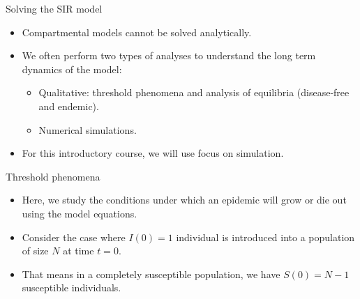 \documentclass[
  ignorenonframetext,
]{beamer}
\providecommand{\tightlist}{%
  \setlength{\itemsep}{0pt}\setlength{\parskip}{0pt}}\usepackage{longtable,booktabs,array}
\begin{document}
\begin{frame}
\begin{block}{Solving the SIR model}
\label{solving-the-sir-model}
\begin{itemize}
\item
  Compartmental models cannot be solved analytically.
\item
  We often perform two types of analyses to understand the {long term
  dynamics} of the model:

  \begin{itemize}
  \tightlist
  \item
    Qualitative: threshold phenomena and analysis of equilibria
    (disease-free and endemic).\\
  \item
    Numerical simulations.
  \end{itemize}
\end{itemize}

\begin{tcolorbox}[enhanced jigsaw, toprule=.15mm, opacityback=0, bottomtitle=1mm, opacitybacktitle=0.6, colframe=quarto-callout-note-color-frame, titlerule=0mm, breakable, colback=white, title=\textcolor{quarto-callout-note-color}{\faInfo}\hspace{0.5em}{Note}, left=2mm, colbacktitle=quarto-callout-note-color!10!white, arc=.35mm, coltitle=black, bottomrule=.15mm, rightrule=.15mm, leftrule=.75mm, toptitle=1mm]

\begin{itemize}
\tightlist
\item
  For this introductory course, we will use focus on simulation.
\end{itemize}

\end{tcolorbox}
\end{block}
\end{frame}

\begin{frame}
\begin{block}{Threshold phenomena}
\label{threshold-phenomena}
\begin{itemize}
\tightlist
\item
  Here, we study the conditions under which an epidemic will {grow or
  die out} using the model equations.
\end{itemize}
\end{block}
\end{frame}

\begin{frame}
\begin{itemize}
\item
  Consider the case where \(I(0) = 1\) individual is introduced into a
  population of size \(N\) at time \(t = 0\).
\item
  That means in a completely susceptible population, we have
  \(S(0) = N - 1\) susceptible individuals.
\end{itemize}
\end{frame}
\end{document}
